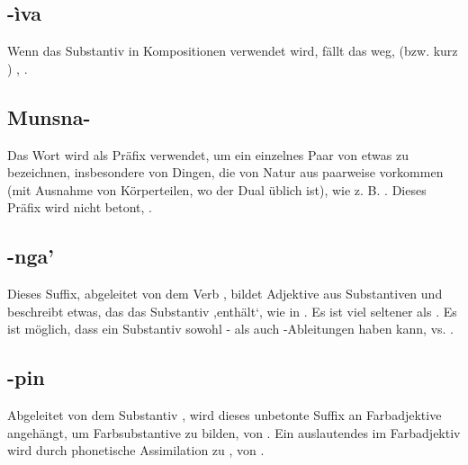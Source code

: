 \subsection{-ìva} Wenn das Substantiv   in Kompositionen verwendet wird, fällt das  weg,  (bzw. kurz ) ,  .

\subsection{Munsna-} Das Wort   wird als Präfix verwendet, um ein einzelnes Paar von etwas zu bezeichnen, insbesondere von Dingen, die von Natur aus paarweise vorkommen (mit Ausnahme von Körperteilen, wo der Dual üblich ist), wie z. B.  . Dieses Präfix wird nicht betont,  .

\subsection{-nga'} Dieses Suffix, abgeleitet von dem Verb  , bildet Adjektive aus Substantiven und beschreibt etwas, das das Substantiv ,enthält‘, wie in  . Es ist viel seltener als . Es ist möglich, dass ein Substantiv sowohl - als auch -Ableitungen haben kann,   vs.  .

\subsection{-pin} Abgeleitet von dem Substantiv  , wird dieses unbetonte Suffix an Farbadjektive angehängt, um Farbsubstantive zu bilden,   von  . Ein auslautendes  im Farbadjektiv wird durch phonetische Assimilation zu ,  von .

